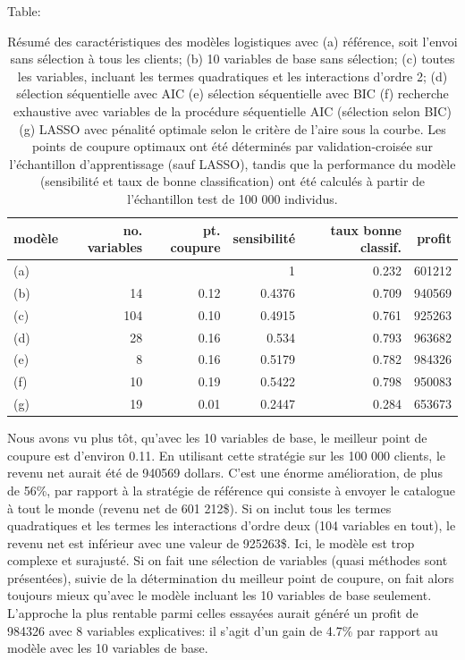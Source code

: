 \documentclass[
  11pt,
  letterpaper,
]{scrbook}
\theoremstyle{definition}
\theoremstyle{remark}
\begin{document}
Table:

\hypertarget{tbl-03-summarylog}{}
\begin{table}
\caption{\label{tbl-03-summarylog}Résumé des caractéristiques des modèles logistiques avec (a) référence,
soit l'envoi sans sélection à tous les clients; (b) 10 variables de base
sans sélection; (c) toutes les variables, incluant les termes
quadratiques et les interactions d'ordre 2; (d) sélection séquentielle
avec AIC (e) sélection séquentielle avec BIC (f) recherche exhaustive
avec variables de la procédure séquentielle AIC (sélection selon BIC)
(g) LASSO avec pénalité optimale selon le critère de l'aire sous la
courbe. Les points de coupure optimaux ont été déterminés par
validation-croisée sur l'échantillon d'apprentissage (sauf LASSO),
tandis que la performance du modèle (sensibilité et taux de bonne
classification) ont été calculés à partir de l'échantillon test de 100
000 individus. }\tabularnewline

\centering
\begin{tabular}{lrrrrr}
\toprule
modèle & no. variables & pt. coupure & sensibilité & taux bonne classif. & profit\\
\midrule
(a) &  &  & 1 & 0.232 & 601212\\
(b) & 14 & 0.12 & 0.4376 & 0.709 & 940569\\
(c) & 104 & 0.10 & 0.4915 & 0.761 & 925263\\
(d) & 28 & 0.16 & 0.534 & 0.793 & 963682\\
(e) & 8 & 0.16 & 0.5179 & 0.782 & 984326\\
\addlinespace
(f) & 10 & 0.19 & 0.5422 & 0.798 & 950083\\
(g) & 19 & 0.01 & 0.2447 & 0.284 & 653673\\
\bottomrule
\end{tabular}
\end{table}

Nous avons vu plus tôt, qu'avec les 10 variables de base, le meilleur
point de coupure est d'environ 0.11. En utilisant cette stratégie sur
les 100 000 clients, le revenu net aurait été de 940569 dollars. C'est
une énorme amélioration, de plus de 56\%, par rapport à la stratégie de
référence qui consiste à envoyer le catalogue à tout le monde (revenu
net de 601 212\$). Si on inclut tous les termes quadratiques et les
termes les interactions d'ordre deux (104 variables en tout), le revenu
net est inférieur avec une valeur de 925263\$. Ici, le modèle est trop
complexe et surajusté. Si on fait une sélection de variables (quasi
méthodes sont présentées), suivie de la détermination du meilleur point
de coupure, on fait alors toujours mieux qu'avec le modèle incluant les
10 variables de base seulement. L'approche la plus rentable parmi celles
essayées aurait généré un profit de 984326 avec 8 variables
explicatives: il s'agit d'un gain de 4.7\% par rapport au modèle avec
les 10 variables de base.
\end{document}
